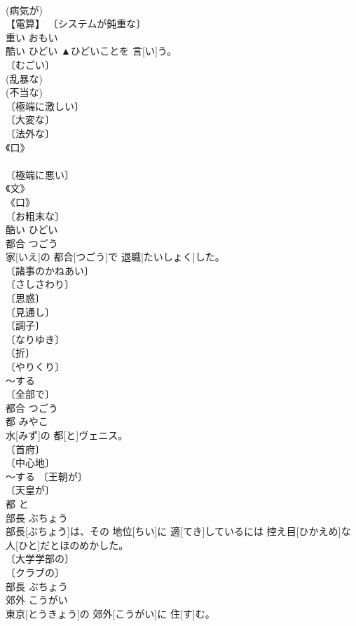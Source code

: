 \documentclass[8pt]{extreport}
\begin{document}
\begin{CJK}{UTF8}{min}
\\	(病気が) 
\\	【電算】 〔システムが鈍重な〕 
\\	重い	おもい	
\\	酷い	ひどい	▲ひどいことを 言[い]う。	
\\	〔むごい〕 
\\	(乱暴な) 
\\	(不当な) 
\\	〔極端に激しい〕 
\\	〔大変な〕 
\\	〔法外な〕 
\\	《口》 
\\	[⇒ひどく２] 
\\	〔極端に悪い〕 
\\	《文》 
\\	《口》 
\\	〔お粗末な〕 
\\	酷い	ひどい	
\\	都合	つごう	
\\	家[いえ]の 都合[つごう]で 退職[たいしょく]した。	
\\	〔諸事のかねあい〕 
\\	〔さしさわり〕 
\\	〔思惑〕 
\\	〔見通し〕 
\\	〔調子〕 
\\	〔なりゆき〕 
\\	〔折〕 
\\	〔やりくり〕 
\\	～する 
\\	〔全部で〕 
\\	[⇒ごうけい]	都合	つごう	
\\	都	みやこ	
\\	水[みず]の 都[と]ヴェニス。	
\\	〔首府〕 
\\	〔中心地〕 
\\	～する 〔王朝が〕 
\\	〔天皇が〕 
\\	都	と	
\\	部長	ぶちょう	
\\	部長[ぶちょう]は、その 地位[ちい]に 適[てき]しているには 控え目[ひかえめ]な 人[ひと]だとほのめかした。	
\\	〔大学学部の〕 
\\	〔クラブの〕 
\\	部長	ぶちょう	
\\	郊外	こうがい	
\\	東京[とうきょう]の 郊外[こうがい]に 住[す]む。	

\end{CJK}
\end{document}
